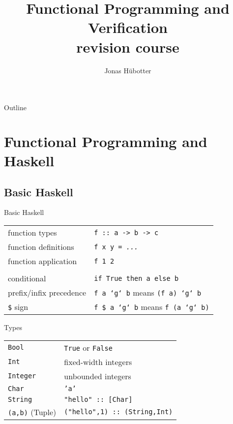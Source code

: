 \documentclass{beamer}
\title[FPV revision course]{Functional Programming and Verification \\ revision course}
\author{Jonas Hübotter}
\date{}
\def\code#1{\texttt{\frenchspacing#1}}
\begin{document}
\begin{frame}
  \titlepage
\end{frame}

\begin{frame}{Outline}
 \tableofcontents[subsectionstyle=hide, subsubsectionstyle=hide]
\end{frame}

\section{Functional Programming and Haskell}

\subsection{Basic Haskell}

\begin{frame}{Basic Haskell}

\begin{tabular}{ll}
    function types & \code{f :: a -> b -> c}\pause \\
    function definitions & \code{f x y = \textit{...}}\pause \\
    function application & \code{f 1 2}\pause \\
    & \\
    conditional & \code{if True then a else b}\pause \\
    prefix/infix precedence & \code{f a `g` b} means \code{(f a) `g` b}\pause \\
    \code{\$} sign & \code{f \$ a `g` b} means \code{f (a `g` b)} \\
\end{tabular}

\end{frame}

\begin{frame}{Types}

\begin{tabular}{ll}
    \code{Bool} & \code{True} or \code{False}\pause \\
    \code{Int} & fixed-width integers\pause \\
    \code{Integer} & unbounded integers\pause \\
    \code{Char} & \code{'a'}\pause \\
    \code{String} & \code{"hello" :: [Char]}\pause \\
    \code{(a,b)} (Tuple) & \code{("hello",1) :: (String,Int)}
\end{tabular}

\end{frame}
\end{document}

